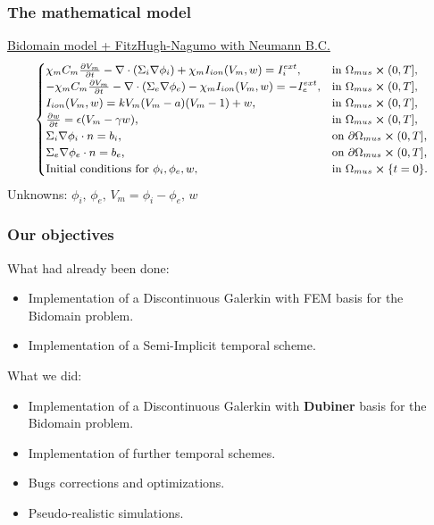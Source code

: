 \documentclass[9pt]{beamer}
\begin{document}
\begin{frame}
\frametitle{The mathematical model}
\center
\underline{Bidomain model + FitzHugh-Nagumo with Neumann B.C.}
\begin{equation*}
\small
\begin{cases}
\chi_m C_m\pdv{V_m}{t} - \nabla \cdot (\Sigma_i \nabla \phi_i) + \chi_m I_{ion}(V_m,w) = I_i^{ext},    & \text{in } \Omega_{mus} \cross (0,T],
\\
-\chi_m C_m\pdv{V_m}{t} - \nabla \cdot (\Sigma_e \nabla \phi_e) - \chi_m I_{ion}(V_m,w) = -I_e^{ext},    & \text{in } \Omega_{mus} \cross (0,T],
\\
I_{ion}(V_m,w)=kV_m(V_m-a)(V_m-1)+w, & \text{in } \Omega_{mus} \cross (0,T],
\\
\pdv{w}{t} = \epsilon(V_m-\gamma w),  & \text{in } \Omega_{mus} \cross (0,T],
\\
\Sigma_i\nabla \phi_i \cdot n = b_i,   & \text{on } \partial \Omega_{mus} \cross (0,T],
\\
\Sigma_e\nabla \phi_e \cdot n = b_e,   & \text{on } \partial \Omega_{mus} \cross (0,T],
\\
\text{Initial conditions for } \phi_i,\phi_e, w, & \text{in } \Omega_{mus}\cross\{t=0\}.
\end{cases}
\end{equation*}
\center \small
Unknowns: $\phi_i,\,\phi_e,\, V_m=\phi_i-\phi_e,\, w$
\end{frame}


\begin{frame}
\frametitle{Our objectives}

What had already been done:
\begin{itemize}
	\item Implementation of a Discontinuous Galerkin with FEM basis for the Bidomain problem.
	\item Implementation of a Semi-Implicit temporal scheme.
\end{itemize} \vspace{2mm}
What we did:
\begin{itemize}
	\item Implementation of a Discontinuous Galerkin with \textbf{Dubiner} basis for the Bidomain problem.
	\item Implementation of further temporal schemes.
	\item Bugs corrections and optimizations.
	\item Pseudo-realistic simulations.
\end{itemize}
\end{frame}
\end{document}
